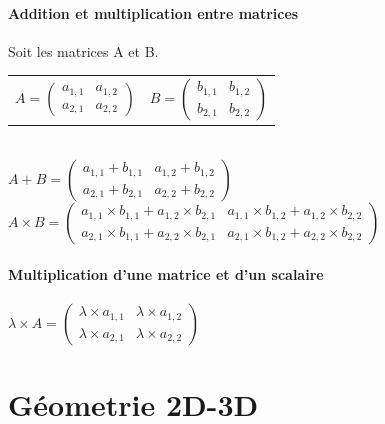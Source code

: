 \documentclass{report}
\begin{document}
\subsection{Addition et multiplication entre matrices}
Soit les matrices A et B.
\begin{tabular}{cc}
 $A = \begin{pmatrix} a_{1,1} & a_{1,2} \\ a_{2,1} & a_{2,2} \end{pmatrix}$ & $B = \begin{pmatrix} b_{1,1} & b_{1,2} \\ b_{2,1} & b_{2,2} \end{pmatrix}$
\end{tabular}\\
\begin{math}
 A + B = \begin{pmatrix}
          a_{1,1} + b_{1,1} & a_{1,2} + b_{1,2}\\
          a_{2,1} + b_{2,1} & a_{2,2} + b_{2,2}
         \end{pmatrix}
\end{math}\\
\begin{math}
 A \times B = \begin{pmatrix}
          a_{1,1} \times b_{1,1} +  a_{1,2} \times b_{2,1} & a_{1,1} \times b_{1,2} +  a_{1,2} \times b_{2,2}\\
          a_{2,1} \times b_{1,1} +  a_{2,2} \times b_{2,1} & a_{2,1} \times b_{1,2} +  a_{2,2} \times b_{2,2}
         \end{pmatrix}
\end{math}
\subsection{Multiplication d'une matrice et d'un scalaire}
\begin{math}
 \lambda \times A = \begin{pmatrix}
          \lambda \times a_{1,1} & \lambda \times a_{1,2}\\
          \lambda \times a_{2,1} & \lambda \times a_{2,2}
         \end{pmatrix}
\end{math}


\part{Géometrie 2D-3D}
\end{document}
